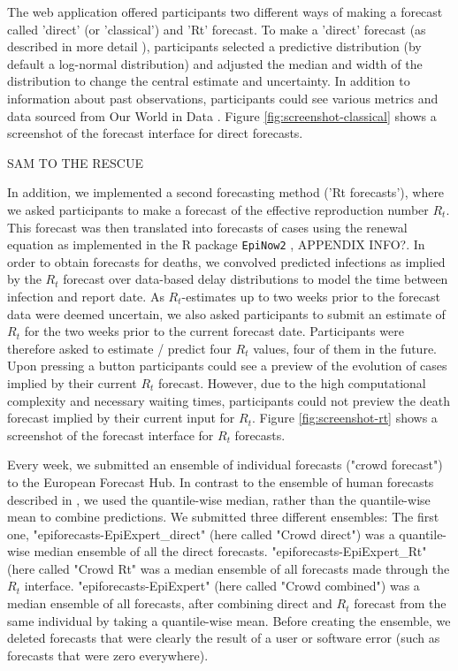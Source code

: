 \documentclass[10pt,a4paper,twocolumn]{article}
\begin{document}
The web application offered participants two different ways of making a forecast called 'direct' (or 'classical') and 'Rt' forecast. To make a 'direct' forecast (as described in more detail \cite{bosseComparingHumanModelbased2022}), participants selected a predictive distribution (by default a log-normal distribution) and adjusted the median and width of the distribution to change the central estimate and uncertainty. In addition to information about past observations, participants could see various metrics and data sourced from Our World in Data \citep{owidcoronavirus}. Figure \ref{fig:screenshot-classical} shows a screenshot of the forecast interface for direct forecasts. 

SAM TO THE RESCUE

In addition, we implemented a second forecasting method ('Rt forecasts'), where we asked participants to make a forecast of the effective reproduction number $R_t$. This forecast was then translated into forecasts of cases using the renewal equation \citep{fraserEstimatingIndividualHousehold2007} as implemented in the \textsf{R} package \texttt{EpiNow2} \citep{epinow2}, APPENDIX INFO?. In order to obtain forecasts for deaths, we convolved predicted infections as implied by the $R_t$ forecast over data-based delay distributions \cite{epinow2, sherrattExploringSurveillanceData2021, abbottEstimatingTimevaryingReproduction2020a} to model the time between infection and report date. As $R_t$-estimates up to two weeks prior to the forecast data were deemed uncertain, we also asked participants to submit an estimate of $R_t$ for the two weeks prior to the current forecast date. Participants were therefore asked to estimate / predict four $R_t$ values, four of them in the future. Upon pressing a button participants could see a preview of the evolution of cases implied by their current $R_t$ forecast. However, due to the high computational complexity and necessary waiting times, participants could not preview the death forecast implied by their current input for $R_t$. Figure \ref{fig:screenshot-rt} shows a screenshot of the forecast interface for $R_t$ forecasts. 

Every week, we submitted an ensemble of individual forecasts ("crowd forecast") to the European Forecast Hub. In contrast to the ensemble of human forecasts described in \citet{bosseComparingHumanModelbased2022}, we used the quantile-wise median, rather than the quantile-wise mean to combine predictions. %
We submitted three different ensembles: The first one, "epiforecasts-EpiExpert\_direct" (here called "Crowd direct") was a quantile-wise median ensemble of all the direct forecasts. "epiforecasts-EpiExpert\_Rt" (here called "Crowd Rt" was a median ensemble of all forecasts made through the $R_t$ interface. "epiforecasts-EpiExpert" (here called "Crowd combined") was a median ensemble of all forecasts, after combining direct and $R_t$ forecast from the same individual by taking a quantile-wise mean. Before creating the ensemble, we deleted forecasts that were clearly the result of a user or software error (such as forecasts that were zero everywhere).
\end{document}
